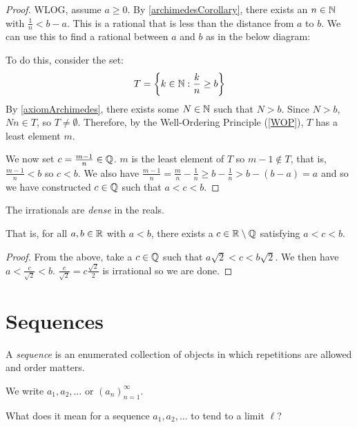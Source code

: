 \documentclass[../main.tex]{subfiles}
\begin{document}
\begin{proof}
  WLOG, assume $a \geq 0$.
  By \cref{archimedesCorollary}, there exists an $n \in \mathbb{N}$ with $\frac{1}{n} < b - a$.
  This is a rational that is less than the distance from $a$ to $b$.
  We can use this to find a rational between $a$ and $b$ as in the below diagram:
  \begin{center}
  \end{center}
  To do this, consider the set:
  \[
    T = \left\{k \in \mathbb{N}: \frac{k}{n} \geq b\right\}
  \]
  By \cref{axiomArchimedes}, there exists some $N \in \mathbb{N}$ such that $N > b$.
  Since $N > b$, $Nn \in T$, so $T \neq \emptyset$.
  Therefore, by the Well-Ordering Principle (\cref{WOP}), $T$ has a least element $m$.

  We now set $c = \frac{m - 1}{n} \in \mathbb{Q}$.
  $m$ is the least element of $T$ so $m - 1 \notin T$, that is, $\frac{m - 1}{n} < b$ so $c < b$.
  We also have $\frac{m - 1}{n} = \frac{m}{n} - \frac{1}{n} \geq b - \frac{1}{n} > b - (b - a) = a$ and so we have constructed $c \in \mathbb{Q}$ such that $a < c < b$.
\end{proof}
\begin{corollary}
  The irrationals are \textit{dense} in the reals.

  That is, for all $a, b \in \mathbb{R}$ with $a < b$, there exists a $c \in \mathbb{R} \setminus \mathbb{Q}$ satisfying $a < c < b$.
\end{corollary}
\begin{proof}
  From the above, take a $c \in \mathbb{Q}$ such that $a\sqrt{2} < c < b\sqrt{2}$.
  We then have $a < \frac{c}{\sqrt{2}} < b$.
  $\frac{c}{\sqrt{2}} = c \frac{\sqrt{2}}{2}$ is irrational so we are done.
\end{proof}
\section{Sequences}
\begin{definition}[Sequence]
  A \textit{sequence} is an enumerated collection of objects in which repetitions are allowed and order matters.

  We write $a_1, a_2, \ldots$ or $(a_n)^{\infty}_{n=1}$.
\end{definition}
What does it mean for a sequence $a_1, a_2, \ldots$ to tend to a limit $\ell$?
\end{document}
